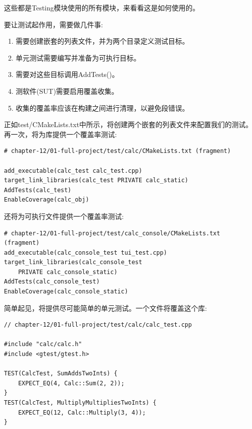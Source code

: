 这些都是Testing模块使用的所有模块，来看看这是如何使用的。


要让测试起作用，需要做几件事:

\begin{enumerate}
\item 
需要创建嵌套的列表文件，并为两个目录定义测试目标。

\item 
单元测试需要编写并准备为可执行目标。

\item 
需要对这些目标调用AddTests()。

\item 
测软件(SUT)需要启用覆盖收集。

\item 
收集的覆盖率应该在构建之间进行清理，以避免段错误。
\end{enumerate}

正如test/CMakeLists.txt中所示，将创建两个嵌套的列表文件来配置我们的测试。再一次，将为库提供一个覆盖率测试:

\begin{lstlisting}[style=styleCMake]
# chapter-12/01-full-project/test/calc/CMakeLists.txt (fragment)

add_executable(calc_test calc_test.cpp)
target_link_libraries(calc_test PRIVATE calc_static)
AddTests(calc_test)
EnableCoverage(calc_obj)
\end{lstlisting}

还将为可执行文件提供一个覆盖率测试:

\begin{lstlisting}[style=styleCMake]
# chapter-12/01-full-project/test/calc_console/CMakeLists.txt (fragment)
add_executable(calc_console_test tui_test.cpp)
target_link_libraries(calc_console_test
	PRIVATE calc_console_static)
AddTests(calc_console_test)
EnableCoverage(calc_console_static)
\end{lstlisting}

简单起见，将提供尽可能简单的单元测试。一个文件将覆盖这个库:

\begin{lstlisting}[style=styleCXX]
// chapter-12/01-full-project/test/calc/calc_test.cpp

#include "calc/calc.h"
#include <gtest/gtest.h>

TEST(CalcTest, SumAddsTwoInts) {
	EXPECT_EQ(4, Calc::Sum(2, 2));
}
TEST(CalcTest, MultiplyMultipliesTwoInts) {
	EXPECT_EQ(12, Calc::Multiply(3, 4));
}
\end{lstlisting}

